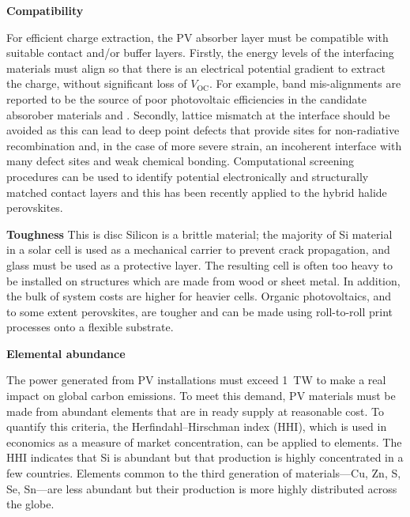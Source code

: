 \textbf{Compatibility}

For efficient charge extraction, the PV absorber layer must be compatible with suitable contact and/or buffer layers. Firstly, the energy levels of the interfacing materials must align so that there is an electrical potential gradient to extract the charge, without significant loss of $V_\textrm{OC}$. For example, band mis-alignments are reported to be the source of poor photovoltaic efficiencies in the candidate absorober materials  and .\autocite{Ganose2016} Secondly, lattice mismatch at the interface should be avoided as this can lead to deep point defects that provide sites for non-radiative recombination and, in the case of more severe strain, an incoherent interface with many defect sites and weak chemical bonding. Computational screening procedures can be used to identify potential electronically and structurally matched contact layers and this has been recently applied to the hybrid halide perovskites.\autocite{Butler2016}


\textbf{Toughness}
This is disc
Silicon is a brittle material; the majority of Si material in a solar cell is used as a mechanical carrier to prevent crack propagation, and glass must be used as a protective layer. The resulting cell is often too heavy to be installed on structures which are made from wood or sheet metal. In addition, the bulk of system costs are higher for heavier cells. Organic photovoltaics, and to some extent perovskites, are tougher and can be made using roll-to-roll print processes onto a flexible substrate.


\textbf{Elemental abundance}

The power generated from PV installations must exceed \SI{1}{TW} to make a real impact on global carbon emissions.\autocite{Battersby2019} To meet this demand, PV materials must be made from abundant elements that are in ready supply at reasonable cost. To quantify this criteria, the Herfindahl–Hirschman index (HHI), which is used in economics as a measure of market concentration, can be applied to elements. The HHI indicates that Si is abundant but that production is highly concentrated in a few countries. Elements common to the third generation of materials---Cu, Zn, S, Se, Sn---are less abundant but their production is more highly distributed across the globe.\autocite{Gaultois2013}



